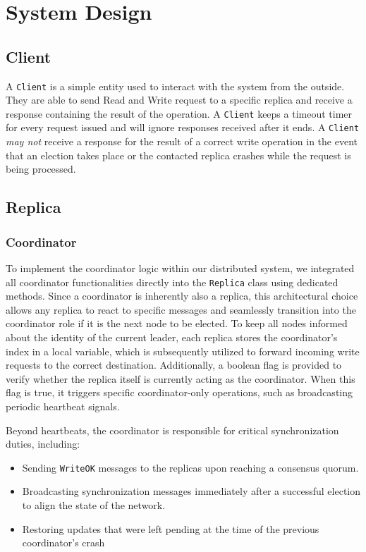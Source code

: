 \section{System Design}
\subsection{Client}
A \texttt{Client} is a simple entity used to interact with the system from the outside. They are able to send Read and Write request to
a specific replica and receive a response containing the result of the operation. A \texttt{Client} keeps a timeout timer for every
request issued and will ignore responses received after it ends. A \texttt{Client} \textit{may not} receive a response for the result of a
correct write operation in the event that an election takes place or the contacted replica crashes while the request is being processed.

\subsection{Replica}
\subsubsection{Coordinator}
To implement the coordinator logic within our distributed system, we integrated all coordinator functionalities directly into the \texttt{Replica} class using dedicated methods. Since a coordinator is inherently also a replica, this architectural choice allows any replica to react to specific messages and seamlessly transition into the coordinator role if it is the next node to be elected. 
To keep all nodes informed about the identity of the current leader, each replica stores the coordinator's index in a local variable, which is subsequently utilized to forward incoming write requests to the correct destination. Additionally, a boolean flag is provided to verify whether the replica itself is currently acting as the coordinator. When this flag is true, it triggers specific coordinator-only operations, such as broadcasting periodic heartbeat signals.

Beyond heartbeats, the coordinator is responsible for critical synchronization duties, including:
\begin{itemize}
    \item Sending \texttt{WriteOK} messages to the replicas upon reaching a consensus quorum.
    \item Broadcasting synchronization messages immediately after a successful election to align the state of the network.
    \item Restoring updates that were left pending at the time of
        the previous coordinator's crash
\end{itemize}

